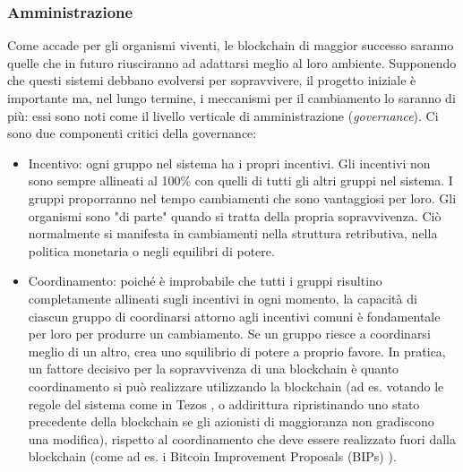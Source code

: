\subsubsection{Amministrazione}
Come accade per gli organismi viventi, le blockchain di maggior successo saranno quelle che in futuro riusciranno ad adattarsi meglio al loro ambiente. Supponendo che questi sistemi debbano evolversi per sopravvivere, il progetto iniziale è importante ma, nel lungo termine, i meccanismi per il cambiamento lo saranno di più: essi sono noti come il livello verticale di amministrazione (\emph{governance}). Ci sono due componenti critici della governance:
\begin{itemize}
	\item
	      Incentivo: ogni gruppo nel sistema ha i propri incentivi. Gli incentivi non sono sempre allineati al 100\% con quelli di tutti gli altri gruppi nel sistema. I gruppi proporranno nel tempo cambiamenti che sono vantaggiosi per loro. Gli organismi sono "di parte" quando si tratta della propria sopravvivenza. Ciò normalmente si manifesta in cambiamenti nella struttura retributiva, nella politica monetaria o negli equilibri di potere.

	\item
	      Coordinamento: poiché è improbabile che tutti i gruppi risultino completamente allineati sugli incentivi in ogni momento, la capacità di ciascun gruppo di coordinarsi attorno agli incentivi comuni è fondamentale per loro per produrre un cambiamento. Se un gruppo riesce a coordinarsi meglio di un altro, crea uno squilibrio di potere a proprio favore. In pratica, un fattore decisivo per la sopravvivenza di una blockchain è quanto coordinamento si può realizzare utilizzando la blockchain (ad es. votando le regole del sistema come in Tezos \cite{c34}, o addirittura ripristinando uno stato precedente della blockchain se gli azionisti di maggioranza non gradiscono una modifica), rispetto al coordinamento che deve essere realizzato fuori dalla blockchain (come ad es. i Bitcoin Improvement Proposals (BIPs)
	      \cite{c3}).

\end{itemize}

